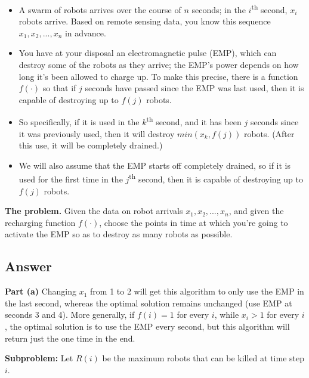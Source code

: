\documentclass[12pt, letterpaper]{article}
\begin{document}
\begin{itemize}
    \item A swarm of robots arrives over the course of $n$ seconds; in the $i$\textsuperscript{th} second, $x_i$ robots arrive. 
    Based on remote sensing data, you know this sequence $x_1, x_2, ... , x_n$ in advance.
    
    \item You have at your disposal an electromagnetic pulse (EMP), which can destroy some of the robots as they arrive; the EMP's power depends on how long it's been allowed to charge up. 
    To make this precise, there is a function $f(·)$ so that if $j$ seconds have passed since the EMP was last used, then it is capable of destroying up to $f(j)$ robots.
    
    \item So specifically, if it is used in the $k$\textsuperscript{th} second, and it has been $j$ seconds since it was previously used, then it will destroy $min(x_k , f(j))$ robots. (After this use, it will be completely drained.)
    
    \item We will also assume that the EMP starts off completely drained, so if it is used for the first time in the $j$\textsuperscript{th} second, then it is capable of destroying up to $f(j)$ robots.
\end{itemize}

\noindent\textbf{The problem.} Given the data on robot arrivals $x_1, x_2, ... , x_n$, and given the recharging function $f(·)$, choose the points in time at which you're going to activate the EMP so as to destroy as many robots as possible.

\subsection*{Answer}

\vspace{5mm}
\noindent\textbf{Part (a)}
Changing $x_1$ from 1 to 2 will get this algorithm to only use the EMP in the last second, whereas the optimal solution remains unchanged (use EMP at seconds 3 and 4).
More generally, if $f(i) = 1$ for every $i$, while $x_i > 1$ for every $i$, the optimal solution is to use the EMP every second, but this algorithm will return just the one time in the end.

\vspace{5mm}
\noindent\textbf{Subproblem:}
Let $R(i)$ be the maximum robots that can be killed at time step $i$.
\end{document}
